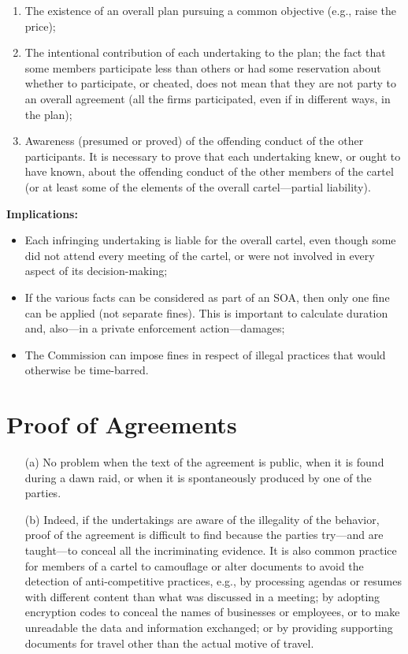             \begin{enumerate}
                \item The existence of an overall plan pursuing a common objective (e.g., raise the price);
                \item The intentional contribution of each undertaking to the plan; the fact that some members participate less than others or had some reservation about whether to participate, or cheated, does not mean that they are not party to an overall agreement (all the firms participated, even if in different ways, in the plan);
                \item Awareness (presumed or proved) of the offending conduct of the other participants. It is necessary to prove that each undertaking knew, or ought to have known, about the offending conduct of the other members of the cartel (or at least some of the elements of the overall cartel—partial liability).
            \end{enumerate}
            
            \noindent \textbf{Implications:}
            
            \begin{itemize}
                \item Each infringing undertaking is liable for the overall cartel, even though some did not attend every meeting of the cartel, or were not involved in every aspect of its decision-making;
                \item If the various facts can be considered as part of an SOA, then only one fine can be applied (not separate fines). This is important to calculate duration and, also—in a private enforcement action—damages;
                \item The Commission can impose fines in respect of illegal practices that would otherwise be time-barred.
            \end{itemize}
            
\section{Proof of Agreements}

    \begin{enumerate}
        \item[(a)] No problem when the text of the agreement is public, when it is found during a dawn raid, or when it is spontaneously produced by one of the parties.
        \item[(b)] Indeed, if the undertakings are aware of the illegality of the behavior, proof of the agreement is difficult to find because the parties try—and are taught—to conceal all the incriminating evidence. It is also common practice for members of a cartel to camouflage or alter documents to avoid the detection of anti-competitive practices, e.g., by processing agendas or resumes with different content than what was discussed in a meeting; by adopting encryption codes to conceal the names of businesses or employees, or to make unreadable the data and information exchanged; or by providing supporting documents for travel other than the actual motive of travel.
    \end{enumerate}
    
